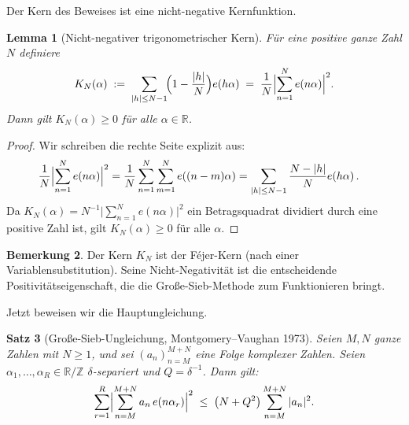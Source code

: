 \documentclass[12pt,a4paper]{amsart}
\newtheorem{theorem}{Satz}[section]
\newtheorem{lemma}[theorem]{Lemma}
\theoremstyle{definition}
\newtheorem{bemerkung}[theorem]{Bemerkung}
\newcommand{\Z}{\mathbb{Z}}
\newcommand{\R}{\mathbb{R}}
\newcommand{\eexp}[1]{e\!\left(#1\right)}
\begin{document}
Der Kern des Beweises ist eine nicht-negative Kernfunktion.

\begin{lemma}[Nicht-negativer trigonometrischer Kern]\label{lem:kern}
  Für eine positive ganze Zahl $N$ definiere
  \[
    K_N(\alpha)
    \;:=\;
    \sum_{|h| \leq N-1}\!\Bigl(1 - \frac{|h|}{N}\Bigr)\eexp{h\alpha}
    \;=\;
    \frac{1}{N}\Bigl|\sum_{n=1}^{N}\eexp{n\alpha}\Bigr|^{2}.
  \]
  Dann gilt $K_N(\alpha) \geq 0$ für alle $\alpha \in \R$.
\end{lemma}

\begin{proof}
  Wir schreiben die rechte Seite explizit aus:
  \begin{align*}
    \frac{1}{N}\Bigl|\sum_{n=1}^{N}\eexp{n\alpha}\Bigr|^{2}
    &= \frac{1}{N}\sum_{n=1}^{N}\sum_{m=1}^{N}\eexp{(n-m)\alpha}
    = \sum_{|h| \leq N-1}\frac{N-|h|}{N}\eexp{h\alpha}.
  \end{align*}
  Da $K_N(\alpha) = N^{-1}\bigl|\sum_{n=1}^N \eexp{n\alpha}\bigr|^2$
  ein Betragsquadrat dividiert durch eine positive Zahl ist, gilt
  $K_N(\alpha) \geq 0$ für alle $\alpha$.
\end{proof}

\begin{bemerkung}
  Der Kern $K_N$ ist der Féjer-Kern (nach einer Variablensubstitution).
  Seine Nicht-Negativität ist die entscheidende Positivitätseigenschaft,
  die die Große-Sieb-Methode zum Funktionieren bringt.
\end{bemerkung}

Jetzt beweisen wir die Hauptungleichung.

\begin{theorem}[Große-Sieb-Ungleichung, Montgomery--Vaughan 1973]%
  \label{thm:grosses_sieb}
  Seien $M, N$ ganze Zahlen mit $N \geq 1$, und sei $(a_n)_{n=M}^{M+N}$
  eine Folge komplexer Zahlen.  Seien $\alpha_1, \ldots, \alpha_R \in \R/\Z$
  $\delta$-separiert und $Q = \delta^{-1}$.  Dann gilt:
  \[
    \sum_{r=1}^{R}\Bigl|\sum_{n=M}^{M+N} a_n\,\eexp{n\alpha_r}\Bigr|^{2}
    \;\leq\;
    \bigl(N + Q^{2}\bigr)\sum_{n=M}^{M+N}|a_n|^{2}.
  \]
\end{theorem}
\end{document}

